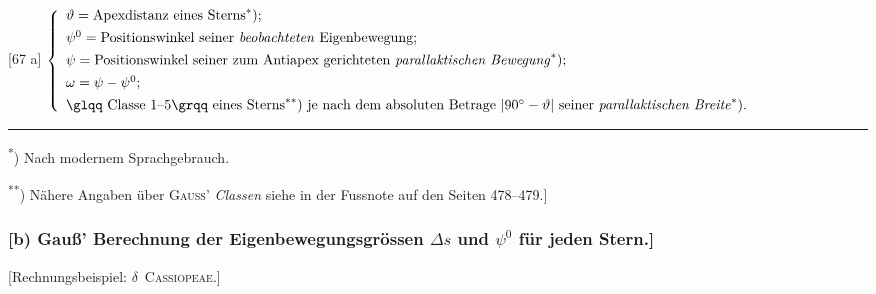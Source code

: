 \documentclass[12pt,a4paper]{article}
\theoremstyle{plain}
\theoremstyle{definition}
\theoremstyle{remark}
\begin{document}
\begin{small}
\begin{center}
[67 a] $\left\{\begin{array}{l}
\vartheta = \text{Apexdistanz eines Sterns}^{*})\text{;}\\[4pt]
\psi^{0} = \text{Positionswinkel seiner \textit{beobachteten} Eigenbewegung}\text{;}\\[4pt]
\psi = \text{Positionswinkel seiner zum Antiapex gerichteten \textit{parallaktischen Bewegung}}^{*}\text{)}\text{;}\\[4pt]
\omega = \psi - \psi^{0}\text{;}\\[4pt]
\text{\glqq Classe 1--5\grqq\ eines Sterns}^{**}) \text{ je nach dem absoluten Betrage } |90^{\circ} - \vartheta| \text{ seiner \textit{parallaktischen Breite}}^{*}\text{)}.
\end{array}\right.$

\medskip
\hfill\begin{minipage}{4cm}
\end{minipage}
\end{center}
\end{small}

\medskip
\noindent\rule{\textwidth}{0.4pt}
\begin{footnotesize}
\textsuperscript{*}) Nach modernem Sprachgebrauch.

\textsuperscript{**}) N\"ahere Angaben \"uber \textsc{Gau\ss'} \textit{\glqq Classen\grqq} siehe in der Fussnote
auf den Seiten 478--479.]
\end{footnotesize}

\subsubsection*{[b) Gau\ss' Berechnung der Eigenbewegungsgr\"ossen $\Delta s$ und $\psi^{0}$ f\"ur jeden Stern.]}

\begin{center}
[Rechnungsbeispiel: $\delta$~\textsc{Cassiopeae}.]
\end{center}
\end{document}
